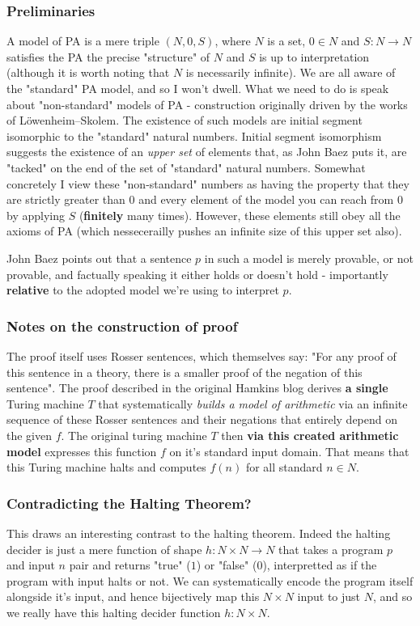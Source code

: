 \documentclass{article}
\begin{document}
\subsubsection{Preliminaries}
A model of PA is a mere triple $(N, 0, S)$, where $N$ is a set, $0 \in N$ and $S: N \rightarrow N$ satisfies the PA the precise "structure" of $N$ and $S$ is up to interpretation (although it is worth noting that $N$ is necessarily infinite). We are all aware of the "standard" PA model, and so I won't dwell. What we need to do is speak about "non-standard" models of PA - construction originally driven by the works of Löwenheim–Skolem. The existence of such models are initial segment isomorphic to the "standard" natural numbers. Initial segment isomorphism suggests the existence of an \emph{upper set} of elements that, as John Baez puts it, are "tacked" on the end of the set of "standard" natural numbers. Somewhat concretely I view these "non-standard" numbers as having the property that they are strictly greater than $0$ and every element of the model you can reach from 0 by applying $S$ (\textbf{finitely} many times). However, these elements still obey all the axioms of PA (which nessecerailly pushes an infinite size of this upper set also).

John Baez points out that a sentence $p$ in such a model is merely provable, or not provable, and factually speaking it either holds or doesn't hold - importantly \textbf{relative} to the adopted model we're using to interpret $p$.

\subsubsection{Notes on the construction of proof}
The proof itself uses Rosser sentences, which themselves say: "For any proof of this sentence in a theory, there is a smaller proof of the negation of this sentence". The proof described in the original Hamkins blog derives \textbf{a single} Turing machine $T$ that systematically \emph{builds a model of arithmetic} via an infinite sequence of these Rosser sentences and their negations that entirely depend on the given $f$. The original turing machine $T$ then \textbf{via this created arithmetic model} expresses this function $f$ on it's standard input domain. That means that this Turing machine halts and computes $f(n)$ for all standard $n \in N$.

\subsubsection{Contradicting the Halting Theorem?}
This draws an interesting contrast to the halting theorem. Indeed the halting decider is just a mere function of shape $h: N \times N \rightarrow N$ that takes a program $p$ and input $n$ pair and returns "true" ($1$) or "false" ($0$), interpretted as if the program with input halts or not. We can systematically encode the program itself alongside it's input, and hence bijectively map this $N \times N$ input to just $N$, and so we really have this halting decider function $h: N \times N$.
\end{document}
